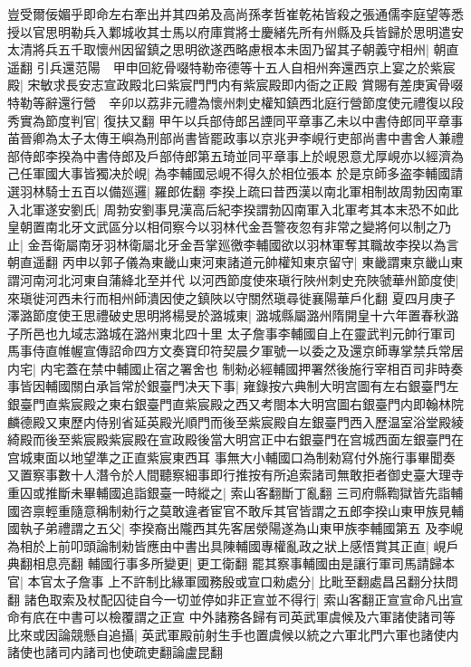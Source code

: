 豈受爾佞媚乎即命左右牽出并其四弟及高尚孫孝哲崔乾祐皆殺之張通儒李庭望等悉授以官思明勒兵入鄴城收其士馬以府庫賞將士慶緒先所有州縣及兵皆歸於思明遣安太清將兵五千取懷州因留鎮之思明欲遂西略慮根本未固乃留其子朝義守相州|{
	朝直遥翻}
引兵還范陽　甲申回紇骨啜特勒帝德等十五人自相州奔還西京上宴之於紫宸殿|{
	宋敏求長安志宣政殿北曰紫宸門門内有紫宸殿即内衙之正殿}
賞賜有差庚寅骨啜特勒等辭還行營　辛卯以荔非元禮為懷州刺史權知鎮西北庭行營節度使元禮復以段秀實為節度判官|{
	復扶又翻}
甲午以兵部侍郎呂諲同平章事乙未以中書侍郎同平章事苖晉卿為太子太傳王嶼為刑部尚書皆罷政事以京兆尹李峴行吏部尚書中書舍人兼禮部侍郎李揆為中書侍郎及戶部侍郎第五琦並同平章事上於峴恩意尤厚峴亦以經濟為己任軍國大事皆獨决於峴|{
	為李輔國忌峴不得久於相位張本}
於是京師多盗李輔國請選羽林騎士五百以備廵邏|{
	羅郎佐翻}
李揆上疏曰昔西漢以南北軍相制故周勃因南軍入北軍遂安劉氏|{
	周勃安劉事見漢高后紀李揆謂勃囚南軍入北軍考其本末恐不如此}
皇朝置南北牙文武區分以相伺察今以羽林代金吾警夜忽有非常之變將何以制之乃止|{
	金吾衛屬南牙羽林衛屬北牙金吾掌廵徼李輔國欲以羽林軍奪其職故李揆以為言朝直遥翻}
丙申以郭子儀為東畿山東河東諸道元帥權知東京留守|{
	東畿謂東京畿山東謂河南河北河東自蒲絳北至并代}
以河西節度使來瑱行陜州刺史充陜虢華州節度使|{
	來瑱徙河西未行而相州師潰因使之鎮陜以守關然瑱尋徙襄陽華戶化翻}
夏四月庚子澤潞節度使王思禮破史思明將楊旻於潞城東|{
	潞城縣屬潞州隋開皇十六年置春秋潞子所邑也九域志潞城在潞州東北四十里}
太子詹事李輔國自上在靈武判元帥行軍司馬事侍直帷幄宣傳詔命四方文奏寶印符契晨夕軍號一以委之及還京師專掌禁兵常居内宅|{
	内宅蓋在禁中輔國止宿之署舍也}
制勑必經輔國押署然後施行宰相百司非時奏事皆因輔國關白承旨常於銀臺門决天下事|{
	雍錄按六典制大明宫圖有左右銀臺門左銀臺門直紫宸殿之東右銀臺門直紫宸殿之西又考閤本大明宫圖右銀臺門内即翰林院麟德殿又東歷内侍别省延英殿光順門而後至紫宸殿自左銀臺門西入歷温室浴堂殿綾綺殿而後至紫宸殿紫宸殿在宣政殿後當大明宫正中右銀臺門在宫城西面左銀臺門在宫城東面以地望準之正直紫宸東西耳}
事無大小輔國口為制勑寫付外施行事畢聞奏又置察事數十人潛令於人間聽察細事即行推按有所追索諸司無敢拒者御史臺大理寺重囚或推斷未畢輔國追詣銀臺一時縱之|{
	索山客翻斷丁亂翻}
三司府縣鞫獄皆先詣輔國咨禀輕重隨意稱制勑行之莫敢違者宦官不敢斥其官皆謂之五郎李揆山東甲族見輔國執子弟禮謂之五父|{
	李揆裔出隴西其先客居滎陽遂為山東甲族李輔國第五}
及李峴為相於上前叩頭論制勑皆應由中書出具陳輔國專權亂政之狀上感悟賞其正直|{
	峴戶典翻相息亮翻}
輔國行事多所變更|{
	更工衛翻}
罷其察事輔國由是讓行軍司馬請歸本官|{
	本官太子詹事}
上不許制比緣軍國務殷或宣口勑處分|{
	比毗至翻處昌呂翻分扶問翻}
諸色取索及杖配囚徒自今一切並停如非正宣並不得行|{
	索山客翻正宣宣命凡出宣命有㡳在中書可以檢覆謂之正宣}
中外諸務各歸有司英武軍虞候及六軍諸使諸司等比來或因論競懸自追攝|{
	英武軍殿前射生手也置虞候以統之六軍北門六軍也諸使内諸使也諸司内諸司也使疏吏翻論盧昆翻}
